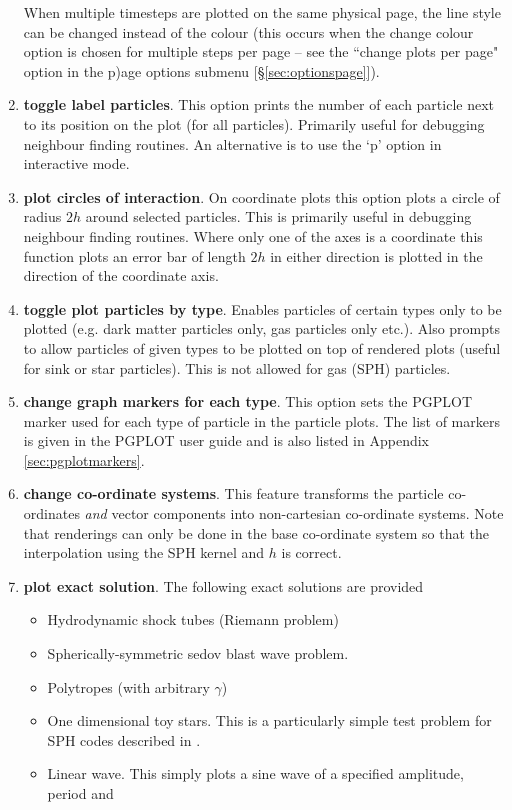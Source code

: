 \documentclass[a4paper,11pt]{article}
\begin{document}
\begin{enumerate}
 When multiple timesteps are plotted on the same physical page, the line style can be
changed instead of the colour (this occurs when the change colour option is chosen for multiple steps per page
-- see the ``change plots per page" option in the p)age options submenu [\S\vref{sec:optionspage}]).
\item \textbf{toggle label particles}. This option prints the number of each particle
next to its position on the plot (for all particles). Primarily useful for debugging neighbour finding
routines. An alternative is to use the `p' option in interactive mode.
\item \textbf{plot circles of interaction}. On coordinate plots this option plots a circle of
radius $2h$ around selected particles. 
This is primarily useful in debugging neighbour finding routines. Where only one of the axes is a 
coordinate this function plots an error bar of length $2h$ in either direction is plotted
in the direction of the coordinate axis.
\item \textbf{toggle plot particles by type}. Enables particles of certain types only to be plotted
(e.g. dark matter particles only, gas particles only etc.). Also prompts to allow particles of given types to be
plotted on top of rendered plots (useful for sink or star particles). This is not allowed for gas
(SPH) particles.
\item \textbf{change graph markers for each type}. This option sets the PGPLOT marker used for each
type of particle in the particle plots. The list of markers is given in the
PGPLOT user guide and is also listed in Appendix \ref{sec:pgplotmarkers}. 
\item \textbf{change co-ordinate systems}. This feature transforms the particle
co-ordinates \emph{and} vector components into non-cartesian co-ordinate systems. Note that
renderings can only be done in the base co-ordinate system so that the interpolation using the SPH
kernel and $h$ is correct.  
\item \textbf{plot exact solution}. The following exact solutions are provided
\begin{itemize}
\item Hydrodynamic shock tubes (Riemann problem)
\item Spherically-symmetric sedov blast wave problem.
\item Polytropes (with arbitrary $\gamma$)
\item One dimensional toy stars. This is a particularly simple test
problem for SPH codes described in \citet{mp04}.
\item Linear wave. This simply plots a sine wave of a specified amplitude, period and

\end{itemize}
\end{enumerate}
\end{document}
